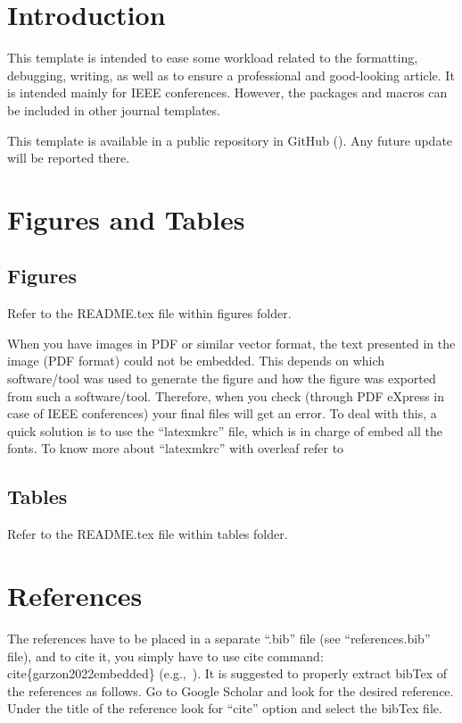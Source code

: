 \documentclass[conference]{IEEEtran}
\begin{document}
\section{Introduction}\label{introduction}
This template is intended to ease some workload related to the formatting, debugging, writing, as well as to ensure a professional and good-looking article. 
It is intended mainly for IEEE conferences.
However, the packages and macros can be included in other journal templates.

This template is available in a public repository in GitHub (\href{https://github.com/EstebanJGC/IEEE-Conference-Template---GZ.git}{}).
Any future update will be reported there.

\section{Figures and Tables}
\subsection{Figures}
Refer to the README.tex file within figures folder.

When you have images in PDF or similar vector format, the text presented in the image (PDF format) could not be embedded.
This depends on which software/tool was used to generate the figure and how the figure was exported from such a software/tool.
Therefore, when you check (through PDF eXpress in case of IEEE conferences) your final files will get an error.
To deal with this, a quick solution is to use the ``latexmkrc'' file, which is in charge of embed all the fonts.
To know more about ``latexmkrc'' with overleaf refer to \href{https://www.overleaf.com/learn/latex/Articles/How_to_use_latexmkrc_with_Overleaf}{}


\subsection{Tables}
Refer to the README.tex file within tables folder.


\section{References}
The references have to be placed in a separate ``.bib'' file (see ``references.bib'' file), and to cite it, you simply have to use cite command: \arraybackslash \\cite\{garzon2022embedded\} (e.g.,~\cite{garzon2021gain}).
It is suggested to properly extract bibTex of the references as follows.
Go to Google Scholar and look for the desired reference. 
Under the title of the reference look for ``cite'' option and select the bibTex file.
\end{document}
